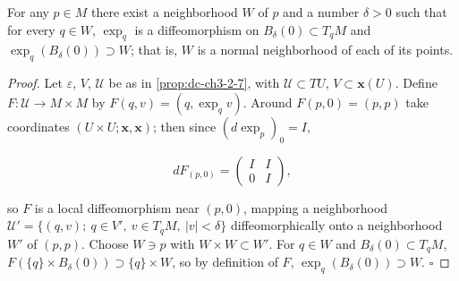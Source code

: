 \begin{theorem}
  \label{thm:dc-ch3-3-7}
  \leanok
  For any $p\in M$ there exist a neighborhood $W$ of $p$ and a number $\delta>0$
  such that for every $q\in W$, $\exp_q$ is a diffeomorphism on
  $B_\delta(0)\subset T_qM$ and $\exp_q(B_\delta(0))\supset W$; that is, $W$ is a
  normal neighborhood of each of its points.
\end{theorem}
\begin{proof}
  \leanok
  Let $\varepsilon$, $V$, $\mathcal{U}$ be as in \cref{prop:dc-ch3-2-7}, with
  $\mathcal{U}\subset TU$, $V\subset\mathbf{x}(U)$. Define $F:\mathcal{U}\to M\times M$
  by $F(q,v)=(q,\exp_q v)$. Around $F(p,0)=(p,p)$ take coordinates
  $(U\times U;\mathbf{x},\mathbf{x})$; then since $(d\exp_p)_0=I$,

  $$
  dF_{(p,0)}=\begin{pmatrix}I & I\\ 0 & I\end{pmatrix},
  $$

  so $F$ is a local diffeomorphism near $(p,0)$, mapping a neighborhood
  $\mathcal{U}'=\{(q,v);\ q\in V',\ v\in T_qM,\ |v|<\delta\}$ diffeomorphically onto
  a neighborhood $W'$ of $(p,p)$. Choose $W\ni p$ with $W\times W\subset W'$. For
  $q\in W$ and $B_\delta(0)\subset T_qM$, $F(\{q\}\times B_\delta(0))\supset\{q\}\times W$,
  so by definition of $F$, $\exp_q(B_\delta(0))\supset W$. $\square$


\end{proof}
